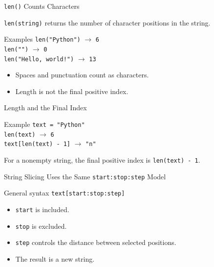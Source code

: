 \documentclass[aspectratio=169,10pt]{beamer}
\begin{document}
\begin{frame}{\texttt{len()} Counts Characters}
  \begin{cpdefinition}
    \texttt{len(string)} returns the number of character positions in the string.
  \end{cpdefinition}

  \begin{block}{Examples}
    \texttt{len("Python")} $\longrightarrow$ \texttt{6}\\
    \texttt{len("")} $\longrightarrow$ \texttt{0}\\
    \texttt{len("Hello, world!")} $\longrightarrow$ \texttt{13}
  \end{block}

  \begin{itemize}
    \item Spaces and punctuation count as characters.
    \item Length is not the final positive index.
  \end{itemize}
\end{frame}

\begin{frame}{Length and the Final Index}
  \begin{block}{Example}
    \texttt{text = "Python"}\\[0.08in]
    \texttt{len(text)} $\longrightarrow$ \texttt{6}\\
    \texttt{text[len(text) - 1]} $\longrightarrow$ \texttt{"n"}
  \end{block}

  \begin{keyidea}
    For a nonempty string, the final positive index is \texttt{len(text) - 1}.
  \end{keyidea}
\end{frame}



\begin{frame}{String Slicing Uses the Same \texttt{start:stop:step} Model}
  \begin{block}{General syntax}
    \centering
    \Large\texttt{text[start:stop:step]}
  \end{block}

  \begin{itemize}
    \item \texttt{start} is included.
    \item \texttt{stop} is excluded.
    \item \texttt{step} controls the distance between selected positions.
    \item The result is a new string.
  \end{itemize}
\end{frame}
\end{document}
